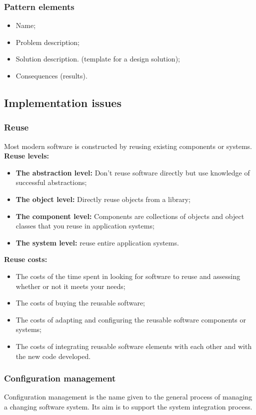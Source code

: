 \documentclass[../ESOF_notes.tex]{subfiles}
\begin{document}
\subsubsection{Pattern elements}
\begin{itemize}
    \item Name;
    \item Problem description;
    \item Solution description. (template for a design solution);
    \item Consequences (results).
\end{itemize}
\subsection{Implementation issues}
\subsubsection{Reuse}
Most modern software is constructed by reusing existing components or systems.
\newline
\newline
\textbf{Reuse levels:}
\begin{itemize}
    \item \textbf {The abstraction level:} Don’t reuse software directly but use knowledge of successful abstractions;
    \item \textbf {The object level:} Directly reuse objects from a library;
    \item \textbf {The component level:} Components are collections of objects and object classes that you reuse in application systems;
    \item \textbf {The system level:} reuse entire application systems.
\end{itemize}
\textbf{Reuse costs:}
\begin{itemize}
    \item The costs of the time spent in looking for software to reuse and assessing whether or not it meets your needs;
    \item  The costs of buying the reusable software;
    \item The costs of adapting and configuring the reusable software components or systems;
    \item The costs of integrating reusable software elements with each other and with the new code developed.
\end{itemize}
\subsubsection{Configuration management}
Configuration management is the name given to the general process of managing a changing software system.
\newline
Its aim is to support the system integration process.
\end{document}
